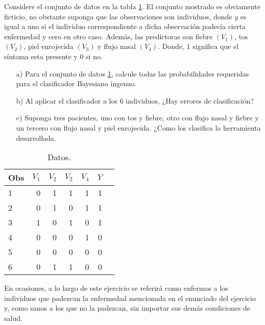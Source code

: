 \documentclass[10.5pt,notitlepage]{article}
\renewcommand{\qedsymbol}{$\blacksquare$}
\theoremstyle{plain}
\newenvironment{rem}
  {\pushQED{\qed}\renewcommand{\qedsymbol}{$\triangle$}\remarkex}
  {\popQED\endremarkex}
\begin{document}
\begin{exo}
Considere el conjunto de datos en la tabla \ref{tab:1}. El conjunto mostrado es obviamente ficticio, no obstante suponga que las observaciones son individuos, donde \(y\) es igual a uno si el individuo correspondiente a dicha observación padecía cierta enfermedad y cero en otro caso. Además, las predictoras son fiebre \((V_1)\), tos \((V_2)\), piel enrojecida \((V_3)\) y flujo nasal \((V_4)\). Donde, \(1\) significa que el síntoma esta presente y \(0\) si no.  
\begin{itemize}
    \item[a)] Para el conjunto de datos \ref{tab:1}, calcule todas las probabilidades requeridas para el clasificador Bayesiano ingenuo.
    \item[b)] Al aplicar el clasificador a los \(6\) individuos, ¿Hay errores de clasificación?
    \item[c)] Suponga tres pacientes, uno con tos y fiebre, otro con flujo nasal y fiebre y un tercero con flujo nasal y piel enrojecida. ¿Como los clasifica la herramienta desarrollada. 
\end{itemize}
\end{exo}
\begin{table}[H]
        \centering
        \begin{tabular}{@{}l@{\hskip 0.3in}r@{\hskip 0.3in}r@{\hskip 0.3in}r@{\hskip 0.3in}r@{\hskip 0.3in}r@{\hskip 0.3in}r@{}}
            \toprule
            Obs & \(V_1\) & \(V_2\) & \(V_2\) & \(V_4\) & \(Y\)\\
            \midrule
            1 & 0 &1 & 1&1 &1\\
            2 & 0 &1 & 0&1 &1\\
            3 & 1 &0 & 1&0 &1\\
            4 & 0 &0 & 0&1 &0\\
            5 & 0 &0 & 0&0 &0\\
            6 & 0 &1 & 1&0 &0\\
            \bottomrule
        \end{tabular}
        \caption{Datos.}
        \label{tab:1}
\end{table}
\begin{rem}[Ejercicio 2.]
En ocasiones, a lo largo de este ejercicio se referirá como enfermos a los individuos que padezcan la enfermedad mencionada en el enunciado del ejercicio y, como sanos a los que no la padezcan, sin importar sus demás condiciones de salud. 
\end{rem}
\end{document}
